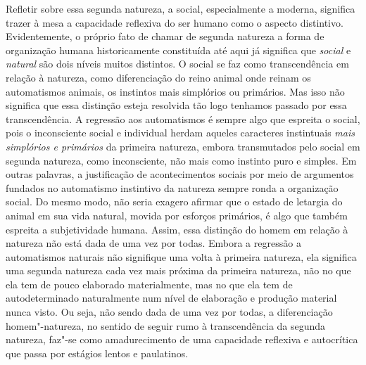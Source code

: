 {Refletir sobre essa segunda natureza, a social, especialmente a moderna,
significa trazer à mesa a capacidade reflexiva do ser humano como o
aspecto distintivo. Evidentemente, o próprio fato de chamar de segunda
natureza a forma de organização humana historicamente constituída até
aqui já significa que \emph{social} e \emph{natural} são dois níveis
muitos distintos. O social se faz como transcendência em relação à
natureza, como diferenciação do reino animal onde reinam os automatismos
animais, os instintos mais simplórios ou primários. Mas isso não
significa que essa distinção esteja resolvida tão logo tenhamos passado
por essa transcendência. A regressão aos automatismos é sempre algo que
espreita o social, pois o inconsciente social e individual herdam
aqueles caracteres instintuais \emph{mais simplórios e primários} da
primeira natureza, embora transmutados pelo social em segunda natureza,
como inconsciente, não mais como instinto puro e simples. Em outras
palavras, a justificação de acontecimentos sociais por meio de
argumentos fundados no automatismo instintivo da natureza sempre ronda a
organização social. Do mesmo modo, não seria exagero afirmar que o
estado de letargia do animal em sua vida natural, movida por esforços
primários, é algo que também espreita a subjetividade humana. Assim,
essa distinção do homem em relação à natureza não está dada de uma vez
por todas. Embora a regressão a automatismos naturais não signifique uma
volta à primeira natureza, ela significa uma segunda natureza cada vez
mais próxima da primeira natureza, não no que ela tem de pouco elaborado
materialmente, mas no que ela tem de autodeterminado naturalmente num
nível de elaboração e produção material nunca visto. Ou seja, não sendo
dada de uma vez por todas, a diferenciação homem"-natureza, no sentido de
seguir rumo à transcendência da segunda natureza, faz"-se como
amadurecimento de uma capacidade reflexiva e autocrítica que passa por
estágios lentos e paulatinos.

}
